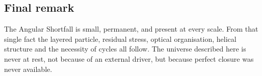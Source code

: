 \subsection{Final remark}
The Angular Shortfall is small, permanent, and present at every scale. From that
single fact the layered particle, residual stress, optical organisation, helical
structure and the necessity of cycles all follow. The universe described here is
never at rest, not because of an external driver, but because perfect closure was
never available.

\appendix
